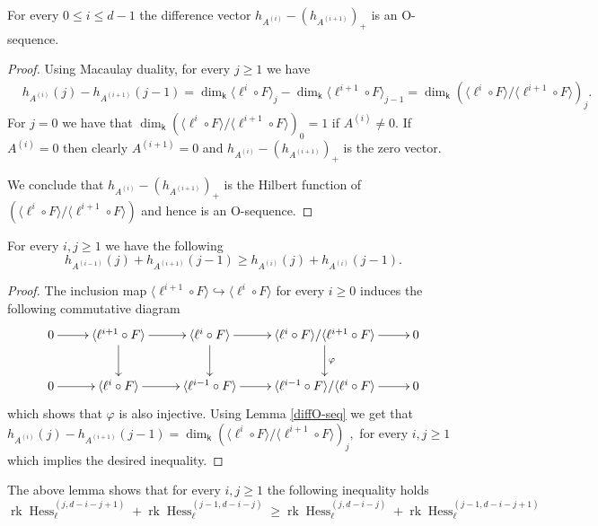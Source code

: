 \documentclass[12pt]{amsart}
\numberwithin{equation}{section}
\theoremstyle{plain} \newtheorem{theorem}{Theorem}[section]
\theoremstyle{definition} \newtheorem{definition}[theorem]{Definition}
\DeclareMathOperator{\Hess}{Hess}\DeclareMathOperator{\rk}{rk}
\DeclareMathOperator{\K}{\mathsf{k}}
\begin{document}
\begin{lemma}\label{diffO-seq}
For every $0\leq i\leq d-1$ the difference vector $ h_{A^{(i)}}-(h_{A^{(i+1)}})_+$ is an O-sequence.
\end{lemma}
\begin{proof}%
Using Macaulay duality, for every $j\geq 1$ we have 
\begin{align*}
& h_{A^{(i)}}(j)-h_{A^{(i+1)}}(j-1) = \dim_{\K}\langle \ell^i\circ F\rangle_j -\dim_{\K}\langle \ell^{i+1}\circ F\rangle_{j-1}=\dim_{\K}\left(\langle \ell^i\circ F\rangle/\langle \ell^{i+1}\circ F\rangle\right)_{j}.
\end{align*}
For $j=0$ we have that $\dim_{\K}\left(\langle \ell^i\circ F\rangle/\langle \ell^{i+1}\circ F\rangle\right)_{0}=1$ if ${A^{(i)}}\neq 0$. If ${A^{(i)}}=0$ then clearly ${A^{(i+1)}}= 0$ and    $ h_{A^{(i)}}-(h_{A^{(i+1)}})_+$ is the zero vector.\par 
\noindent  We conclude that $h_{A^{(i)}}-(h_{A^{(i+1)}})_+$ is the Hilbert function of $\left(\langle \ell^i\circ F\rangle/\langle \ell^{i+1}\circ F\rangle\right)$ and hence is an O-sequence.
\end{proof}
\begin{lemma}\label{additiveRank}
For every $i,j\geq 1$ we have the following
$$
h_{A^{(i-1)}}(j)+h_{A^{(i+1)}}(j-1)\geq h_{A^{(i)}}(j)+h_{A^{(i)}}(j-1).
$$
\end{lemma}
\begin{proof}
The inclusion map $\langle \ell^{i+1}\circ F\rangle\hookrightarrow \langle \ell^{i}\circ F\rangle$ for every $i\geq 0$ induces the following commutative diagram
$$
\xymatrix{
0\ar[r]& \langle \ell^{i+1}\circ F\rangle \ar[d]\ar[r]&\langle \ell^{i}\circ F\rangle  \ar[d]\ar[r]& \langle \ell^{i}\circ F\rangle/ \langle \ell^{i+1}\circ F\rangle \ar[d]^{\varphi}\ar[r]&0\\
0\ar[r]& \langle \ell^i\circ F\rangle\ar[r]&\langle \ell^{i-1}\circ F\rangle\ar[r]& \langle \ell^{i-1}\circ F\rangle/ \langle \ell^i\circ F\rangle\ar[r]&0\\
}
$$
which shows that $\varphi$ is also injective.
Using Lemma \ref{diffO-seq} we get that $h_{A^{(i)}}(j)-h_{A^{(i+1)}}(j-1) = \dim_{\K}\left(\langle \ell^i\circ F\rangle/\langle \ell^{i+1}\circ F\rangle\right)_{j},$ for every $i,j\geq 1$ which implies the desired inequality.
\end{proof}
\begin{remark}
The above lemma shows that for every $i,j\geq 1$ the following inequality holds
$$
\rk \Hess_\ell^{(j,d-i-j+1)}+\rk \Hess_\ell^{(j-1,d-i-j)}\geq \rk \Hess_\ell^{(j,d-i-j)}+\rk \Hess_\ell^{(j-1,d-i-j+1)}
$$
\end{remark}
\end{document}

